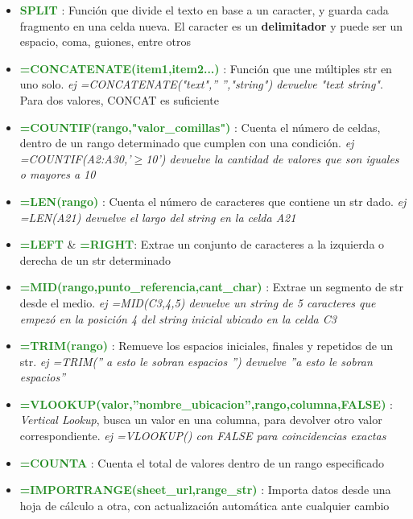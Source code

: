 \begin{itemize}
{\begin{itemize}
    \end{itemize}} 
    \item {\textcolor{ForestGreen}{\textbf{SPLIT}} : Función que divide el texto en base a un caracter, y guarda cada fragmento en una celda nueva. El caracter es un \textbf{delimitador} y puede ser un espacio, coma, guiones, entre otros}
    \item {\textcolor{ForestGreen}{\textbf{=CONCATENATE(item1,item2...)}} : Función que une múltiples \gls{str} en uno solo. \textit{ej =CONCATENATE("text",'' '',"string") devuelve "text string"}. Para dos valores, CONCAT es suficiente}
    \item {\textcolor{ForestGreen}{\textbf{=COUNTIF(rango,"valor\_comillas")}} : Cuenta el número de celdas, dentro de un rango determinado que cumplen con una condición. \textit{ej =COUNTIF(A2:A30,'${\geq}$10') devuelve la cantidad de valores que son iguales o mayores a 10}}
    \item {\textcolor{ForestGreen}{\textbf{=LEN(rango)}} : Cuenta el número de caracteres que contiene un \gls{str} dado. \textit{ej =LEN(A21) devuelve el largo del string en la celda A21}}
    \item {\textcolor{ForestGreen}{\textbf{=LEFT}} \& \textcolor{ForestGreen}{\textbf{=RIGHT}}: Extrae un conjunto de caracteres a la izquierda o derecha de un \gls{str} determinado}
    \item {\textcolor{ForestGreen}{\textbf{=MID(rango,punto\_referencia,cant\_char)}} : Extrae un segmento de \gls{str} desde el medio. \textit{ej =MID(C3,4,5) devuelve un string de 5 caracteres que empezó en la posición 4 del string inicial ubicado en la celda C3}}
    \item {\textcolor{ForestGreen}{\textbf{=TRIM(rango)}} : Remueve los espacios iniciales, finales y repetidos de un \gls{str}. \textit{ej =TRIM('' a esto le sobran espacios  '') devuelve ''a esto le sobran espacios''}}
    \item {\textcolor{ForestGreen}{\textbf{=VLOOKUP(valor,''nombre\_ubicacion'',rango,columna,FALSE)}} : \textit{Vertical Lookup}, busca un valor en una columna, para devolver otro valor correspondiente. \textit{ej =VLOOKUP() con FALSE para coincidencias exactas}}
    \item {\textcolor{ForestGreen}{\textbf{=COUNTA}} : Cuenta el total de valores dentro de un rango especificado}
    \item {\textcolor{ForestGreen}{\textbf{=IMPORTRANGE(sheet\_url,range\_str)}} : Importa datos desde una hoja de cálculo a otra, con actualización automática ante cualquier cambio}

\end{itemize}
